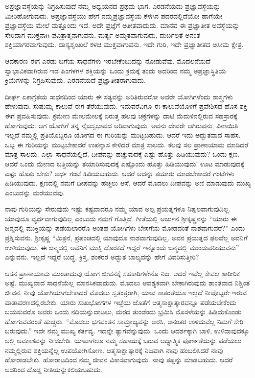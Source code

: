 ಅಪ್ರಜ್ಞಾವಸ್ಥೆಯನ್ನು ನಿಗ್ರಹಿಸುವುದೆ ನಮ್ಮ ಅಧ್ಯಯನದ ಪ್ರಥಮ ಭಾಗ. ಎರಡನೆಯದು ಪ್ರಜ್ಞಾವಸ್ಥೆಯನ್ನು ಮೀರಿಹೋಗುವುದು. ಅಪ್ರಜ್ಞಾವಸ್ಥೆಯು ಹೇಗೆ ನಮ್ಮ\break ಪ್ರಜ್ಞಾವಸ್ಥೆಯ ಕೆಳಗಿನ ಪದರದಲ್ಲಿದೆಯೋ ಹಾಗೆಯೇ ಪ್ರಜ್ಞಾವಸ್ಥೆಯ ಮೇಲೆ ಮತ್ತೊಂದು ಇದೆ. ಅದೇ ಪ್ರಜ್ಞೆಗೆ ಅತೀತವಾದುದು. ಮಾನವ ಈ ಪ್ರಜ್ಞಾತೀತ ಅವಸ್ಥೆಯನ್ನು ಸೇರಿದಾಗ ಮುಕ್ತನಾಗಿ ಪವಿತ್ರಾತ್ಮನಾಗುವನು. ಮರ್ತ್ಯ ಅಮೃತವಾಗುವುದು, ದುರ್ಬಲತೆ ಅನಂತ ಶಕ್ತಿಯಾಗರವಾಗುವುದು. ದಾಸ್ಯಶೃಂಖಲೆ ಕಳಚಿ ಮುಕ್ತವಾಗುವನು. ಇದೇ ಗುರಿ, ಇದೇ ಪ್ರಜ್ಞಾತೀತದ ಅಸೀಮ ಕ್ಷೇತ್ರ.

ಆದಕಾರಣ ಈಗ ಎರಡು ಬಗೆಯ ಸಾಧನೆಗಳು ಇರಬೇಕೆಂಬುದನ್ನು ನೋಡುವೆವು. ಮೊದಲನೆಯದೆ ಸ್ವಾಭಾವಿಕವಾಗಿರುವ ಇಡ ಪಿಂಗಳಗಳ ಶಕ್ತಿಯನ್ನು ಒಂದು ಕ್ರಮಕ್ಕೆ ತಂದು ಅದರಿಂದ ನಮ್ಮ ಅಪ್ರಜ್ಞಾಸ್ಥಿತಿಯ ಕ್ರಿಯೆಗಳನ್ನು ನಿಗ್ರಹಿಸುವುದು. ಎರಡನೆಯದೆ ಪ್ರಜ್ಞಾತೀತರಾಗುವುದು.

ದೀರ್ಘ ಏಕಾಗ್ರತೆಯ ಸಾಧನದಿಂದ ಯಾರು ಈ ಸತ್ಯವನ್ನು ಅರಿತಿರುವರೋ ಅವರೇ ಯೋಗಿಗಳೆಂದು ಶಾಸ್ತ್ರಗಳು ಹೇಳುವುವು. ಸುಷುಮ್ನ ಕಾಲುವೆ ಈಗ ತೆರೆಯುವುದು. ಇದುವರೆವಿಗೂ ಈ ಕಾಲುವೆಯೊಳಗೆ ಪ್ರವೇಶಿಸದ ಹೊಸ ಶಕ್ತಿ ಈಗ ಪ್ರವಹಿಸುವುದು. ಕ್ರಮೇಣ ಮೇಲಮೇಲಕ್ಕೆ ಏರುತ್ತ ಹಲವು ಚಕ್ರಗಳನ್ನು ದಾಟಿ ಮೆದುಳಿನಲ್ಲಿರುವ ಸಹಸ್ರಾರಕ್ಕೆ ಹೋಗುವುದು. ಆಗ ಯೋಗಿಗೆ ತನ್ನ ನೈಜಸ್ವಭಾವದ ಅರಿವಾಗುವುದು. ಅವನು ದೇವರೇ ಆಗಿರುವನು. ವಿನಾಯಿತಿ ಇಲ್ಲದೆ ನಮ್ಮಲ್ಲಿ ಪ್ರತಿಯೊಬ್ಬರೂ ಯೋಗದ ಈ ಗುರಿಯನ್ನು ಮುಟ್ಟಬಹುದು. ಆದರೆ ಇದು ಅದ್ಭುತವಾದ ಸಾಹಸ. ಒಬ್ಬ ಈ ಗುರಿಯನ್ನು ಮುಟ್ಟಬೇಕಾದರೆ ಉಪನ್ಯಾಸ ಕೇಳಿದರೆ ಮಾತ್ರ ಸಾಲದು. ಕೆಲವು ಸಲ ಪ್ರಾಣಾಯಾಮ ಮಾಡಿದರೆ ಮಾತ್ರ ಸಾಲದು. ಎಲ್ಲಾ ಸಾಧನೆಯಲ್ಲಿದೆ. ದೀಪವನ್ನು ಹಚ್ಚುವುದಕ್ಕೆ ಎಷ್ಟು ಹೊತ್ತು ಹಿಡಿಯುವುದು? ಒಂದು ಕ್ಷಣ. ಆದರೆ ಒಂದು ಮೇಣದ ಬತ್ತಿಯನ್ನು ತಯಾರಿಸುವುದಕ್ಕೆ ಎಷ್ಟೊಂದು ಹೊತ್ತು ಹಿಡಿಯುವುದು! ಊಟ ಮಾಡುವುದಕ್ಕೆ ಎಷ್ಟು ಹೊತ್ತು ಬೇಕು? ಅರ್ಧ ಗಂಟೆ ಹಿಡಿಯಬಹುದು. ಆದರೆ ಅದನ್ನು ತಯಾರು ಮಾಡಬೇಕಾದರೆ ಗಂಟೆಗಳು ಹಿಡಿಯುವುದು. ಕ್ಷಣದಲ್ಲಿ ನಮಗೆ ದೀಪವನ್ನು ಹಚ್ಚಲು ಆಸೆ. ಆದರೆ ಮೊದಲು ದೀಪವನ್ನು ಅಣಿ ಮಾಡುವುದು ಮುಖ್ಯ ಎಂಬುದನ್ನು ಮರೆಯುವೆವು.

ನಾವು ಗುರಿಯನ್ನು ಸೇರುವುದು ಇಷ್ಟು ಕಷ್ಟವಾದರೂ ನಮ್ಮ ಯಾವ ಅಲ್ಪ ಪ್ರಯತ್ನಗಳೂ ನಿಷ್ಪಲವಾಗುವುದಿಲ್ಲ. ಯಾವುದೂ ವ್ಯರ್ಥವಾಗುವುದಿಲ್ಲ ಎಂಬುದು ನಮಗೆ ಗೊತ್ತಿದೆ. ಗೀತೆಯಲ್ಲಿ ಅರ್ಜುನ ಶ‍್ರೀಕೃಷ್ಣನನ್ನು “ಯಾರು ಈ ಜನ್ಮದಲ್ಲಿ ಮುಕ್ತಿಯನ್ನು ಪಡೆಯಲಾರರೊ ಅಂತಹ ಯೋಗಿಗಳು ಬೇಸಗೆಯ ಮೋಡದಂತೆ ನಾಶವಾಗುವರೆ?'' ಎಂದು ಪ್ರಶ್ನಿಸುವನು. ಶ‍್ರೀಕೃಷ್ಣ “ಮಿತ್ರನೆ, ಪ್ರಪಂಚದಲ್ಲಿ ಯಾವುದೂ ನಾಶವಾಗುವುದಿಲ್ಲ. ಅವನ ಪ್ರಯತ್ನದ ಫಲವೆಲ್ಲ ಅವನಿಗೆ ಉಳಿಯುವುದು. ಈ ಜನ್ಮದಲ್ಲಿ ಅವನಿಗೆ ಮುಕ್ತಿ ದೊರಕದೆ ಇದ್ದರೆ ಇನ್ನೊಂದು ಜನ್ಮದಲ್ಲಿ ಮುಂದುವರಿಯುವನು” ಎನ್ನುವನು. ಇಲ್ಲದೆ ಇದ್ದರೆ ಬುದ್ಧ, ಕ್ರಿಸ್ತ, ಶಂಕರರ ಅದ್ಭುತ ಬಾಲ್ಯವನ್ನು ಹೇಗೆ ವಿವರಿಸುತ್ತೀರಿ?

ಆಸನ ಪ್ರಾಣಾಯಾಮ ಮುಂತಾದುವು ಯೋಗ ಜೀವನಕ್ಕೆ ಸಹಕಾರಿಗಳೇನೊ ನಿಜ. ಆದರೆ ಇವೆಲ್ಲ ಕೇವಲ ಶಾರೀರಿಕ ಅಷ್ಟೆ. ಮುಖ್ಯವಾದ ಸಾಧನೆಯೆಲ್ಲ ಮಾನಸಿಕವಾದುದು. ಮೊದಲು ಆವಶ್ಯಕವಾಗಿ ಬೇಕಾಗಿರುವುದು ಶಾಂತವಾದ ನಿಶ್ಚಿಂತ ಜೀವನ. ನೀವು ಯೋಗಿಯಾಗಬೇಕಾದರೆ ಮೊದಲು ಸ್ವತಂತ್ರರಾಗಿ, ಯಾವ ಕಾತರತೆಯೂ ಇಲ್ಲದೆ ನೀವೊಬ್ಬರೇ ಇರುವ ವಾತಾವರಣದಲ್ಲಿರಬೇಕು. ಯಾರು ಸುಖಭೋಗಗಳ ಇಚ್ಛೆಯ ಜೊತೆಗೆ ಆತ್ಮಸಾಕ್ಷಾತ್ಕಾರವನ್ನೂ ಪಡೆಯಬೇಕೆಂದು ಬಯಸುವರೊ ಅವರು ಒಂದು ನದಿಯನ್ನು\break ದಾಟಲು, ಮರದ ತುಂಡೆಂದು ಭ್ರಮಿಸಿ ಮೊಸಳೆಯನ್ನು ಹಿಡಿದುಕೊಂಡು ಹೋಗುವವರಂತೆ ಹುಚ್ಚರು. “ಮೊದಲು ಭಗವಂತನ ಸಾಮ್ರಾಜ್ಯವನ್ನು ಅರಸಿ, ಅನಂತರ ಉಳಿದುವೆಲ್ಲ ನಿಮಗೆ ಸೇರಿ ಬರುವುದು.'' ಇದೇ ನಮ್ಮ ಮುಖ್ಯ ಕರ್ತವ್ಯ. ಇದನ್ನೇ ತ್ಯಾಗವೆನ್ನುವುದು. ಒಂದು ಆದರ್ಶಕ್ಕಾಗಿ ಬಾಳಿ, ಉಳಿದಾವುದಕ್ಕೂ ಅಲ್ಲಿ ಅವಕಾಶವನ್ನು ನೀಡಬೇಡಿ. ಯಾವಾಗಲೂ ನಮ್ಮ ಸಹಾಯಕ್ಕೆ ಬರುವ ಆಧ್ಯಾತ್ಮಿಕ ಪೂರ್ಣತೆಯನ್ನು ಪಡೆಯಲು ನಮ್ಮಲ್ಲಿರುವ ಶಕ್ತಿಯನ್ನೆಲ್ಲ ಉಪಯೋಗಿಸೋಣ. ಆತ್ಮಸಾಕ್ಷಾತ್ಕಾರಕ್ಕೆ ನಿಜವಾಗಿ ನಾವು ಹಂಬಲಿಸಿದರೆ ನಾವು ಹೋರಾಡಬೇಕು. ಹೋರಾಟದಿಂದ ನಮ್ಮ ಜೀವನ ವಿಕಾಸವಾಗುವುದು. ನಾವು ತಪ್ಪನ್ನು ಮಾಡಬಹುದು. ಆದರೆ ಅದರಿಂದ ದೊಡ್ಡ ನೀತಿಯನ್ನು\break ಕಲಿಯಬಹುದು.

